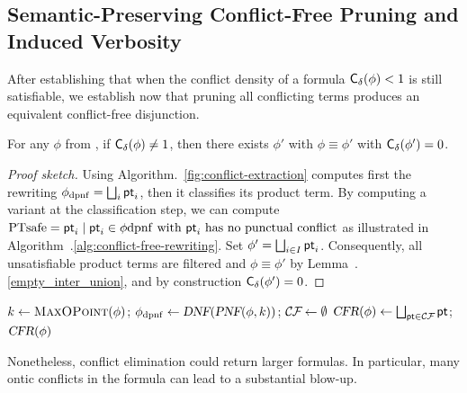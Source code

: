 \subsection{Semantic-Preserving Conflict-Free Pruning and Induced Verbosity}

After establishing that when the conflict density of a formula \(\mathsf{C_\delta} (\phi)<1\) is still satisfiable, we establish now that pruning all conflicting terms produces an equivalent conflict-free disjunction.

\begin{theorem}\label{thm:cfr}
For any $\phi$ from \TDDLfm, if  $ \mathsf{C_\delta} (\phi) \neq 1 $, then there exists $\phi'$ with $\phi \equiv \phi'$ with $\mathsf{C_\delta} (\phi')=0$.
\end{theorem}

\begin{proof}[Proof sketch]
Using Algorithm.~\ref{fig:conflict-extraction}   computes first the \dpnf rewriting $\phi_{\mathrm{dpnf}}=\bigsqcup_i \mathsf{pt}_i$, then it classifies its product term. By computing a variant at the classification step, we can compute $\text{PT}\text{safe}={ \mathsf{pt}_i \mid \mathsf{pt}_i \in \phi{\mathrm{dpnf}}  \text{ with } \mathsf{pt}_i \text{ has no punctual conflict}}$ as illustrated in Algorithm~.\ref{alg:conflict-free-rewriting}. Set \(\phi'=\bigsqcup_{i\in I}\mathsf{pt}_i\). Consequently, all unsatisfiable product terms are filtered and $\phi \equiv \phi'$ by Lemma~.\ref{empty_inter_union}, and by construction $\mathsf{C_\delta} (\phi')=0$.
\end{proof}

\begin{algorithm}[H]
\caption{Conflict-Free Rewriting \(\Namb\)}\label{alg:conflict-free-rewriting}
\KwIn{\(\phi\in\TDDLfm\)} 
$k\gets\textsc{MaxOPoint}(\phi)$; \quad
\(\phi_{\mathrm{dpnf}}\gets\textsl{DNF}(\textsl{PNF}(\phi,k))\); \quad
\(\CF\gets\emptyset\)\;
\(\Namb(\phi)\gets\bigsqcup_{\pt\in\CF}\pt\); \Return \(\textsl{CFR}(\phi)\)
\end{algorithm}

Nonetheless, conflict elimination could return larger formulas. In particular, many ontic conflicts in the \dpnf formula can lead to a substantial blow-up.

